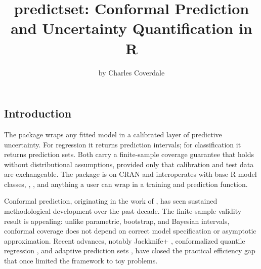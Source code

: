 \title{predictset: Conformal Prediction and Uncertainty Quantification
in R}
\author{by Charles Coverdale}

\maketitle


\subsection{Introduction}\label{introduction}

The  package wraps any fitted model in a calibrated
layer of predictive uncertainty. For regression it returns prediction
intervals; for classification it returns prediction sets. Both carry a
finite-sample coverage guarantee that holds without distributional
assumptions, provided only that calibration and test data are
exchangeable. The package is on CRAN and interoperates with base R model
classes, , , and anything a user can
wrap in a training and prediction function.

Conformal prediction, originating in the work of
\citet{vovk2005algorithmic}, has seen sustained methodological
development over the past decade. The finite-sample validity result is
appealing: unlike parametric, bootstrap, and Bayesian intervals,
conformal coverage does not depend on correct model specification or
asymptotic approximation. Recent advances, notably Jackknife+
\citep{barber2021predictive}, conformalized quantile regression
\citep{romano2019conformalized}, and adaptive prediction sets
\citep{romano2020classification}, have closed the practical efficiency
gap that once limited the framework to toy problems.

